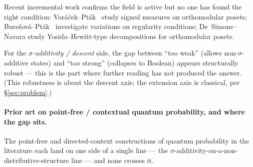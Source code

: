 \documentclass[11pt]{article}
\theoremstyle{definition}
\begin{document}
Recent incremental work confirms the field is active but no one
has found the right condition:
Vor\'{a}\v{c}ek--Pt\'{a}k~\cite{VoracekPtak2023} study signed
measures on orthomodular posets;
Bure\v{s}ov\'{a}--Pt\'{a}k~\cite{BuresovaPtak2023} investigate
variations on regularity conditions; De~Simone--Navara study
Yosida--Hewitt-type decompositions for orthomodular posets.

For the \emph{$\sigma$-additivity / descent} side, the gap between
``too weak'' (allows non-$\sigma$-additive states) and ``too
strong'' (collapses to Boolean) appears structurally robust ---
this is the part where further reading has not produced the answer.
(This robustness is about the descent axis; the extension axis is
classical, per \S\ref{sec:problem}.)

\paragraph{Prior art on point-free / contextual quantum probability,
and where the gap sits.}
The point-free and directed-context constructions of quantum
probability in the literature each land on one side of a single line ---
the $\sigma$-additivity-on-a-non-distributive-structure line --- and
none crosses it.
\end{document}
